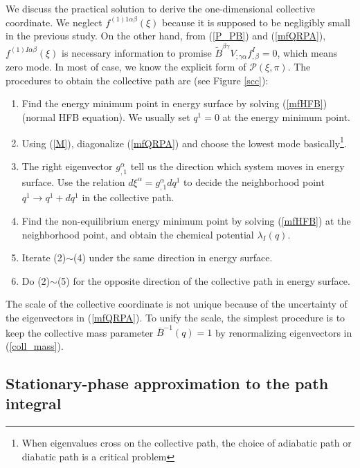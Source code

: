 \documentclass[%
superscriptaddress,
showpacs,
nofootinbib,
amsmath,amssymb,
aps,
prc,
twocolumn,
floatfix ]%
{revtex4-1}
\begin{document}
We discuss the practical solution to derive the one-dimensional collective coordinate. We neglect $f^{(1)1\alpha\beta}(\xi)$ because it is supposed to be negligibly small in the previous study. On the other hand, from (\ref{P_PB}) and (\ref{mfQRPA}), $f^{(1)I\alpha\beta}(\xi)$ is necessary information to promise $\tilde{B}^{\beta\gamma}V_{;\gamma\alpha}f^I_{,\beta}=0$, which means zero mode. In most of case, we know the explicit form of $\mathcal{P}(\xi,\pi)$. The procedures to obtain the collective path are (see Figure \ref{scc}): 
\begin{enumerate}
\item Find the energy minimum point in energy surface by solving (\ref{mfHFB}) (normal HFB equation). We usually set $q^1=0$ at the energy minimum point.
\item Using (\ref{M}), diagonalize (\ref{mfQRPA}) and choose the lowest mode basically\footnote{
When eigenvalues cross on the collective path, the choice of adiabatic path or diabatic path is a critical problem}. 
\item The right eigenvector $g^{\alpha}_{,1}$ tell us the direction which system moves in energy surface. Use the relation $d\xi^{\alpha}=g^{\alpha}_{,1}dq^1$ to decide the neighborhood point $q^1\to q^1+dq^1$ in the collective path. 
\item Find the non-equilibrium energy minimum point by solving (\ref{mfHFB}) at the neighborhood point, and obtain the chemical potential $\lambda_I(q)$. 
\item Iterate (2)$\sim$(4) under the same direction in energy surface. 
\item Do (2)$\sim$(5) for the opposite direction of the collective path in energy surface. 
\end{enumerate}
The scale of the collective coordinate is not unique because of the uncertainty of the eigenvectors in (\ref{mfQRPA}). To unify the scale, the simplest procedure is to keep the collective mass parameter $\bar{B}^{-1}(q)=1$ by renormalizing eigenvectors in (\ref{coll_mass}). 

\subsection{Stationary-phase approximation to the path integral}
\end{document}
